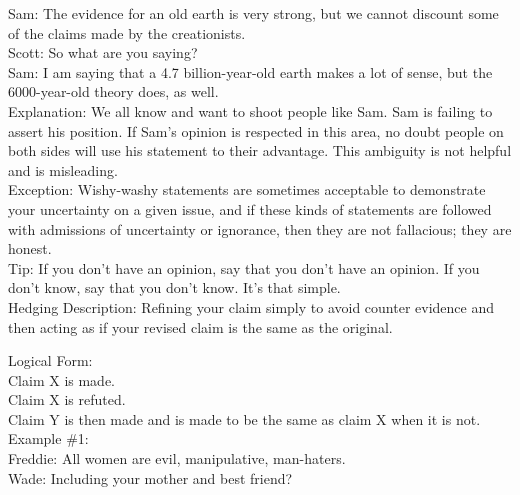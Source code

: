 \documentclass[a4paper,12pt,single,pdftex]{scrartcl}
\begin{document}
    
      Sam: The evidence for an old earth is very strong, but we cannot discount some of the claims made by the creationists.
    \\

    
      Scott: So what are you saying?
    \\

    
      Sam: I am saying that a 4.7 billion-year-old earth makes a lot of sense, but the 6000-year-old theory does, as well.
    \\

    
      Explanation: We all know and want to shoot people like Sam.  Sam is failing to assert his position.  If Sam’s opinion is respected in this area, no doubt people on both sides will use his statement to their advantage.  This ambiguity is not helpful and is misleading.
    \\

    
      Exception: Wishy-washy statements are sometimes acceptable to demonstrate your uncertainty on a given issue, and if these kinds of statements are followed with admissions of uncertainty or ignorance,  then they are not fallacious; they are honest.
    \\

    
      Tip: If you don’t have an opinion, say that you don’t have an opinion.  If you don’t know, say that you don’t know.  It’s that simple.
    \\

  

Hedging
    Description: Refining your claim simply to avoid counter evidence and then acting as if your revised claim is the same as the original.

    
      Logical Form:
    \\

    
      Claim X is made.
    \\

    
      Claim X is refuted.
    \\

    
      Claim Y is then made and is made to be the same as claim X when it is not.
    \\

    
      Example \#1:
    \\

    
      Freddie: All women are evil, manipulative, man-haters.
    \\

    
      Wade: Including your mother and best friend?
    \\
\end{document}
